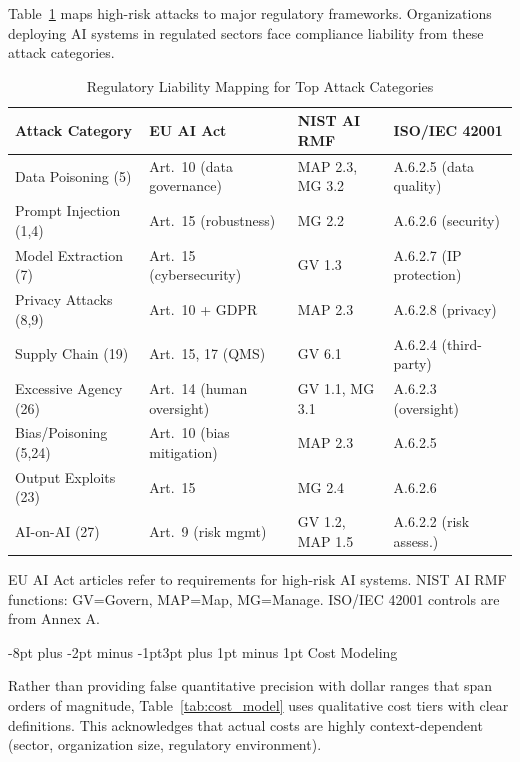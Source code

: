 \documentclass[conference]{IEEEtran}
\makeatletter
\renewcommand{\subsection}{\@startsection{subsection}{2}{\z@}%
  {-8pt plus -2pt minus -1pt}{3pt plus 1pt minus 1pt}%
  {\normalfont\normalsize\bfseries\sffamily\color{accentblue}}}
\newcommand{\tableheaderrow}{\rowcolor{accentblue}}
\renewcommand{\thead}[1]{\textbf{\color{white}\sffamily #1}}
\makeatother
\begin{document}
Table~\ref{tab:regulatory} maps high-risk attacks to major regulatory frameworks. Organizations deploying AI systems in regulated sectors face compliance liability from these attack categories.

\begin{table}[!htbp]
\centering
\caption{Regulatory Liability Mapping for Top Attack Categories}
\label{tab:regulatory}
\renewcommand{\arraystretch}{1.05}
\scriptsize
{}
\begin{tabular}{p{1.8cm}p{1.5cm}p{1.5cm}p{1.8cm}}
\toprule
\tableheaderrow \thead{Attack Category} & \thead{EU AI Act} & \thead{NIST AI RMF} & \thead{ISO/IEC 42001} \\
\midrule
Data Poisoning (5) & Art.\ 10 (data governance) & MAP 2.3, MG 3.2 & A.6.2.5 (data quality) \\
\midrule
Prompt Injection (1,4) & Art.\ 15 (robustness) & MG 2.2 & A.6.2.6 (security) \\
\midrule
Model Extraction (7) & Art.\ 15 (cyber\-security) & GV 1.3 & A.6.2.7 (IP protection) \\
\midrule
Privacy Attacks (8,9) & Art.\ 10 + GDPR & MAP 2.3 & A.6.2.8 (privacy) \\
\midrule
Supply Chain (19) & Art.\ 15, 17 (QMS) & GV 6.1 & A.6.2.4 (third-party) \\
\midrule
Excessive Agency (26) & Art.\ 14 (human oversight) & GV 1.1, MG 3.1 & A.6.2.3 (oversight) \\
\midrule
Bias/Poisoning (5,24) & Art.\ 10 (bias mitigation) & MAP 2.3 & A.6.2.5 \\
\midrule
Output Exploits (23) & Art.\ 15 & MG 2.4 & A.6.2.6 \\
\midrule
AI-on-AI (27) & Art.\ 9 (risk mgmt) & GV 1.2, MAP 1.5 & A.6.2.2 (risk assess.) \\
\bottomrule
\end{tabular}
\begin{tablenotes}
\scriptsize
\item EU AI Act articles refer to requirements for high-risk AI systems. NIST AI RMF functions: GV=Govern, MAP=Map, MG=Manage. ISO/IEC 42001 controls are from Annex A.
\end{tablenotes}
\end{table}

\subsection{Cost Modeling}

Rather than providing false quantitative precision with dollar ranges that span orders of magnitude, Table~\ref{tab:cost_model} uses qualitative cost tiers with clear definitions. This acknowledges that actual costs are highly context-dependent (sector, organization size, regulatory environment).
\end{document}
